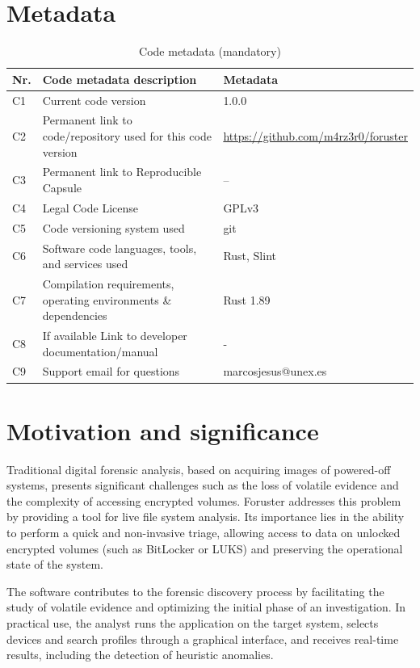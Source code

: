 \documentclass[preprint,12pt, a4paper]{elsarticle}
\begin{document}

\section*{Metadata}
\label{}

\begin{table}[!h]
\begin{tabular}{|l|p{6.5cm}|p{6.5cm}|}
\hline
\textbf{Nr.} & \textbf{Code metadata description} & \textbf{Metadata} \\
\hline
C1 & Current code version & 1.0.0 \\
\hline
C2 & Permanent link to code/repository used for this code version & \url{https://github.com/m4rz3r0/foruster} \\
\hline
C3  & Permanent link to Reproducible Capsule & –\\
\hline
C4 & Legal Code License & GPLv3 \\
\hline
C5 & Code versioning system used & git \\
\hline
C6 & Software code languages, tools, and services used & Rust, Slint  \\
\hline
C7 & Compilation requirements, operating environments \& dependencies & Rust 1.89 \\
\hline
C8 & If available Link to developer documentation/manual & - \\
\hline
C9 & Support email for questions & marcosjesus@unex.es \\
\hline
\end{tabular}
\caption{Code metadata (mandatory)}
\label{codeMetadata}
\end{table}

\section{Motivation and significance}
Traditional digital forensic analysis, based on acquiring images of powered-off systems, presents significant challenges such as the loss of volatile evidence and the complexity of accessing encrypted volumes. Foruster addresses this problem by providing a tool for live file system analysis. Its importance lies in the ability to perform a quick and non-invasive triage, allowing access to data on unlocked encrypted volumes (such as BitLocker or LUKS) and preserving the operational state of the system.

The software contributes to the forensic discovery process by facilitating the study of volatile evidence and optimizing the initial phase of an investigation. In practical use, the analyst runs the application on the target system, selects devices and search profiles through a graphical interface, and receives real-time results, including the detection of heuristic anomalies.
\end{document}
